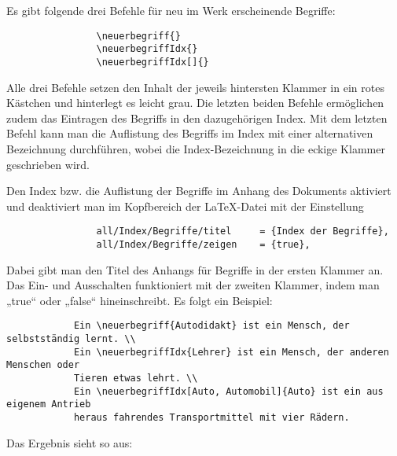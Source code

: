 			Es gibt folgende drei Befehle für neu im Werk erscheinende Begriffe:

			\begin{verbatim}
				\neuerbegriff{}
				\neuerbegriffIdx{}
				\neuerbegriffIdx[]{}
			\end{verbatim}\newline

			Alle drei Befehle setzen den Inhalt der jeweils hintersten Klammer in ein rotes Kästchen und hinterlegt es leicht grau. Die letzten beiden Befehle ermöglichen zudem das Eintragen des Begriffs in den dazugehörigen Index. Mit dem letzten Befehl kann man die Auflistung des Begriffs im Index mit einer alternativen Bezeichnung durchführen, wobei die Index-Bezeichnung in die eckige Klammer geschrieben wird.

			Den Index bzw. die Auflistung der Begriffe im Anhang des Dokuments aktiviert und deaktiviert man im Kopfbereich der \LaTeX{}-Datei mit der Einstellung

			\begin{verbatim}
				all/Index/Begriffe/titel     = {Index der Begriffe},
				all/Index/Begriffe/zeigen    = {true},
			\end{verbatim}\newline

			Dabei gibt man den Titel des Anhangs für Begriffe in der ersten Klammer an. Das Ein- und Ausschalten funktioniert mit der zweiten Klammer, indem man „true“ oder „false“ hineinschreibt. Es folgt ein Beispiel:

			\begin{verbatim}
			Ein \neuerbegriff{Autodidakt} ist ein Mensch, der selbstständig lernt. \\
			Ein \neuerbegriffIdx{Lehrer} ist ein Mensch, der anderen Menschen oder
			Tieren etwas lehrt. \\
			Ein \neuerbegriffIdx[Auto, Automobil]{Auto} ist ein aus eigenem Antrieb
			heraus fahrendes Transportmittel mit vier Rädern.
			\end{verbatim}\newline

			Das Ergebnis sieht so aus: \\

			\newline

